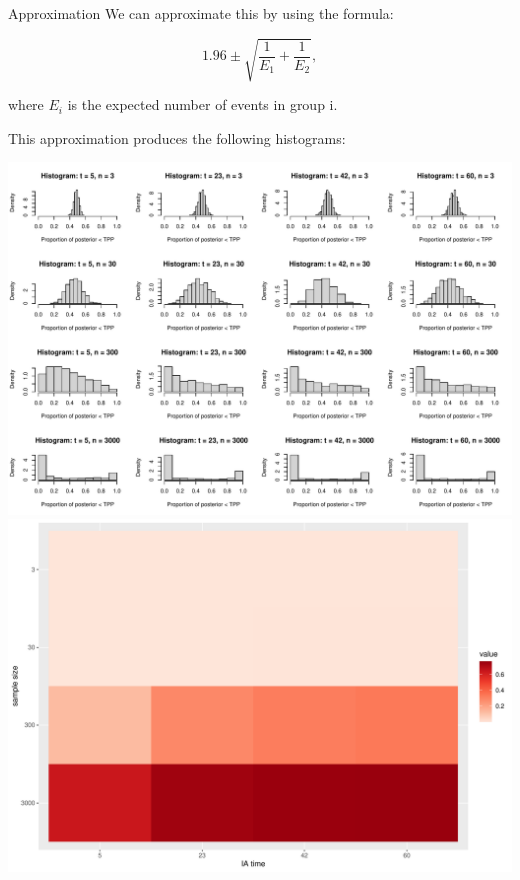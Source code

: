 \documentclass[
  ignorenonframetext,
]{beamer}
\begin{document}
\begin{frame}{Approximation}
\protect\hypertarget{approximation}{}
We can approximate this by using the formula:

\[1.96\pm \sqrt{\frac{1}{E_1}+\frac{1}{E_2}},\]

where \(E_i\) is the expected number of events in group i.

This approximation produces the following histograms:

\includegraphics{DTEInterim_files/figure-beamer/unnamed-chunk-3-1.pdf}
\includegraphics{DTEInterim_files/figure-beamer/unnamed-chunk-3-2.pdf}
\end{frame}
\end{document}
